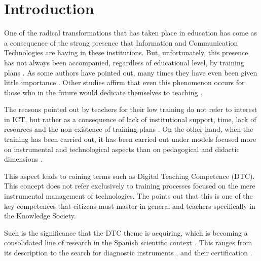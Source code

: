 \documentclass{textolivre}
\begin{document}
\begin{polyabstract}
\begin{portuguese}
\begin{abstract}
\end{abstract}
\end{portuguese}

\end{polyabstract}


\section{Introduction}\label{sec-intro}

One of the radical transformations that has taken place in education has come
as a consequence of the strong presence that Information and Communication
Technologies are having in these institutions. But, unfortunately, this
presence has not always been accompanied, regardless of educational level, by
training plans \cite{casalOtero2018,suarezRodrguez2018,silva2019}.
As some authors have pointed out, many times they have even been given little
importance \cite{bernalBravo2019}. Other studies
affirm that even this phenomenon occurs for those who in the future would
dedicate themselves to teaching \cite{bernalBravo2019}.

The reasons pointed out by teachers for their low training do not refer to
interest in ICT, but rather as a consequence of lack of institutional support,
time, lack of resources and the non-existence of training plans
\cite{fernandezMarquez2018}. On the other hand,
when the training has been carried out, it has been carried out under models
focused more on instrumental and technological aspects than on pedagogical and
didactic dimensions \cite{semerci2018,caberoAlmenara2019a}.

This aspect leads to coining terms such as Digital Teaching Competence (DTC).
This concept does not refer exclusively to training processes focused on the
mere instrumental management of technologies. The \textcite{consejoUE2018}
points out that this is one of the key competences that citizens must
master in general and teachers specifically in the Knowledge Society.

Such is the significance that the DTC theme is acquiring, which is becoming a
consolidated line of research in the Spanish scientific context
\cite{rodrguezGarca2019}. This ranges from its description
to the search for diagnostic instruments \cite{esteve2016,duranCuartero2019,intef2017,padillaHernandez2019},
and their certification \cite{duranCuartero2019,amaya2018,gudmundsdottir2017}.
\end{document}
